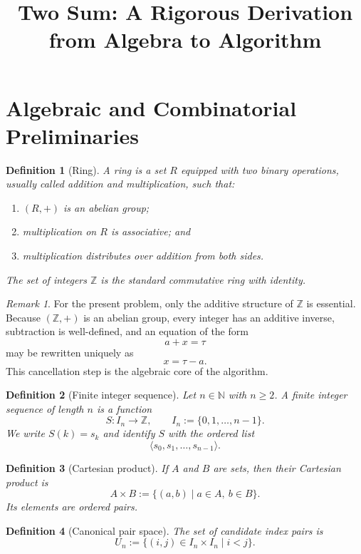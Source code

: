 \documentclass[11pt]{article}
\title{Two Sum: A Rigorous Derivation from Algebra to Algorithm}
\author{}
\date{}
\newtheorem{definition}{Definition}
\theoremstyle{remark}
\newtheorem{remark}{Remark}
\begin{document}
\maketitle

\section{Algebraic and Combinatorial Preliminaries}

\begin{definition}[Ring]
A \emph{ring} is a set \(R\) equipped with two binary operations, usually called addition and multiplication, such that:
\begin{enumerate}
    \item \((R,+)\) is an abelian group;
    \item multiplication on \(R\) is associative; and
    \item multiplication distributes over addition from both sides.
\end{enumerate}
The set of integers \(\mathbb{Z}\) is the standard commutative ring with identity.
\end{definition}

\begin{remark}
For the present problem, only the additive structure of \(\mathbb{Z}\) is essential. Because \((\mathbb{Z},+)\) is an abelian group, every integer has an additive inverse, subtraction is well-defined, and an equation of the form
\[
a + x = \tau
\]
may be rewritten uniquely as
\[
x = \tau - a.
\]
This cancellation step is the algebraic core of the algorithm.
\end{remark}

\begin{definition}[Finite integer sequence]
Let \(n \in \mathbb{N}\) with \(n \ge 2\). A \emph{finite integer sequence of length \(n\)} is a function
\[
S : I_n \to \mathbb{Z},
\qquad
I_n := \{0,1,\dots,n-1\}.
\]
We write \(S(k) = s_k\) and identify \(S\) with the ordered list
\[
\langle s_0, s_1, \dots, s_{n-1} \rangle.
\]
\end{definition}

\begin{definition}[Cartesian product]
If \(A\) and \(B\) are sets, then their \emph{Cartesian product} is
\[
A \times B := \{(a,b) \mid a \in A,\ b \in B\}.
\]
Its elements are ordered pairs.
\end{definition}

\begin{definition}[Canonical pair space]
The set of candidate index pairs is
\[
U_n := \{(i,j) \in I_n \times I_n \mid i < j\}.
\]
\end{definition}
\end{document}
